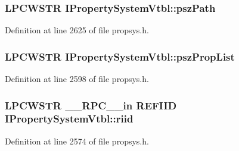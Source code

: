 \subsubsection[{\texorpdfstring{psz\+Path}{pszPath}}]{ {\bf L\+P\+C\+W\+S\+TR} I\+Property\+System\+Vtbl\+::psz\+Path}\hypertarget{struct_i_property_system_vtbl_ad44300084b79f86488cf2f59c3e506aa}{}\label{struct_i_property_system_vtbl_ad44300084b79f86488cf2f59c3e506aa}


Definition at line 2625 of file propsys.\+h.

\subsubsection[{\texorpdfstring{psz\+Prop\+List}{pszPropList}}]{ {\bf L\+P\+C\+W\+S\+TR} I\+Property\+System\+Vtbl\+::psz\+Prop\+List}\hypertarget{struct_i_property_system_vtbl_ac4b7aa1aac2bdf7049252363c2f6a5ea}{}\label{struct_i_property_system_vtbl_ac4b7aa1aac2bdf7049252363c2f6a5ea}


Definition at line 2598 of file propsys.\+h.

\subsubsection[{\texorpdfstring{riid}{riid}}]{ {\bf L\+P\+C\+W\+S\+TR} {\bf \+\_\+\+\_\+\+R\+P\+C\+\_\+\+\_\+in} {\bf R\+E\+F\+I\+ID} I\+Property\+System\+Vtbl\+::riid}\hypertarget{struct_i_property_system_vtbl_aac0ce3818026e4c98281f171ecc252f8}{}\label{struct_i_property_system_vtbl_aac0ce3818026e4c98281f171ecc252f8}


Definition at line 2574 of file propsys.\+h.

